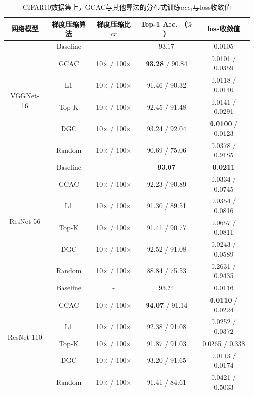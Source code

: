 \documentclass{xdupgthesis}
\begin{document}
\renewcommand{\arraystretch}{1.3}
\begin{table}[ht]
    \centering
    \begin{threeparttable}
        \caption{CIFAR10数据集上，GCAC与其他算法的分布式训练$acc_{1}$与loss收敛值}
        \label{tab_Result-gcc-CIFAR10}
        \begin{tabular}{c|c|c|c|c}
            \toprule
            \toprule
            网络模型 & 梯度压缩算法 & 梯度压缩比$cr$ & Top-1 Acc. （$\%$）& loss收敛值 \\
            \midrule
            \multirow{6}{*}{VGGNet-16} & Baseline & - & 93.17 & 0.0105 \\
                & GCAC   & 10$\times$ / 100$\times$ & \textbf{93.28} / 90.84 & 0.0101 / 0.0359 \\
                & L1     & 10$\times$ / 100$\times$ & 91.46 / 90.32 & 0.0118 / 0.0140 \\
                & Top-K  & 10$\times$ / 100$\times$ & 92.45 / 91.48 & 0.0141 / 0.0291 \\
                & DGC    & 10$\times$ / 100$\times$ & 93.24 / 92.04 & \textbf{0.0100} / 0.0123 \\
                & Random & 10$\times$ / 100$\times$ & 90.69 / 75.06 & 0.0378 / 0.9185 \\
            \midrule
            \multirow{6}{*}{ResNet-56} & Baseline & - & \textbf{93.07} & \textbf{0.0211} \\
                & GCAC   & 10$\times$ / 100$\times$ & 92.23 / 90.89 & 0.0334 / 0.0745 \\
                & L1     & 10$\times$ / 100$\times$ & 91.30 / 89.51 & 0.0354 / 0.0816 \\
                & Top-K  & 10$\times$ / 100$\times$ & 91.41 / 90.77 & 0.0657 / 0.0811\\
                & DGC    & 10$\times$ / 100$\times$ & 92.52 / 91.08 & 0.0243 / 0.0589 \\
                & Random & 10$\times$ / 100$\times$ & 88.84 / 75.53 & 0.2631 / 0.9435 \\
            \midrule
            \multirow{6}{*}{ResNet-110} & Baseline & - & 93.24 & 0.0116 \\
                & GCAC   & 10$\times$ / 100$\times$ & \textbf{94.07} / 91.14 & \textbf{0.0110} / 0.0224 \\
                & L1     & 10$\times$ / 100$\times$ & 92.38 / 91.08 & 0.0252 / 0.0372 \\
                & Top-K  & 10$\times$ / 100$\times$ & 91.87 / 91.03 & 0.0265 / 0.338 \\
                & DGC    & 10$\times$ / 100$\times$ & 93.20 / 91.65 & 0.0113 / 0.0174 \\
                & Random & 10$\times$ / 100$\times$ & 91.41 / 84.61 & 0.0421 / 0.5033 \\
            \bottomrule
            \bottomrule
        \end{tabular}
    \end{threeparttable}
\end{table}
\end{document}
